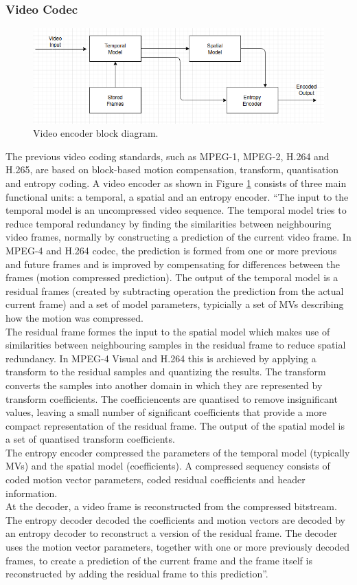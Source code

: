 \subsubsection{Video Codec}
\begin{figure}
\centering
 \includegraphics[width=0.8\linewidth]{Figures/encoder.png}
 \caption{Video encoder block diagram.}
 \label{fig:encoder}
\end{figure}
The previous video coding standards, such as MPEG-1, MPEG-2, H.264 and H.265, are based on block-based motion compensation, transform, quantisation and entropy coding. A video encoder as shown in Figure \ref{fig:encoder} consists of three main functional units: a temporal, a spatial and an entropy encoder. “The input to the temporal model is an uncompressed video sequence. The temporal model tries to reduce temporal redundancy by finding the similarities between neighbouring video frames, normally by constructing a prediction of the current video frame. In MPEG-4 and H.264 codec, the prediction is formed from one or more previous and future frames and is improved by compensating for differences between the frames (motion compressed prediction). The output of the temporal model is a residual frames (created by subtracting operation the prediction from the actual current frame) and a set of model parameters, typicially a set of MVs describing how the motion was compressed. \\
The residual frame formes the input to the spatial model which makes use of similarities between neighbouring samples in the residual frame to reduce spatial redundancy. In MPEG-4 Visual and H.264 this is archieved by applying a transform to the residual samples and quantizing the results. The transform converts the samples into another domain in which they are represented by transform coefficients. The coefficiencents are quantised to remove insignificant values, leaving a small number of significant coefficients that provide a more compact representation of the residual frame. The output of the spatial model is a set of quantised transform coefficients.\\
The entropy encoder compressed the parameters of the temporal model (typically MVs) and the spatial model (coefficients). A compressed sequency consists of coded motion vector parameters, coded residual coefficients and header information.\\
At the decoder, a video frame is reconstructed from the compressed bitstream. The entropy decoder decoded the coefficients and motion vectors are decoded by an entropy decoder to reconstruct a version of the residual frame. The decoder uses the motion vector parameters, together with one or more previously decoded frames, to create a prediction of the current frame and the frame itself is reconstructed by adding the residual frame to this prediction”.
